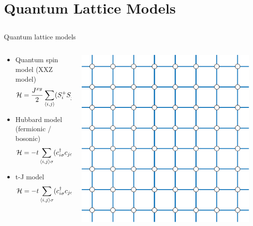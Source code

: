 \section{Quantum Lattice Models}
\subsection*{\redb\whiteb\greenb}

\begin{frame}[fragile]{Quantum lattice models}
  \begin{columns}[T]
    \begin{column}{.8\textwidth}
      \begin{itemize}
        \setlength{\itemsep}{-.5em}
      \item Quantum spin model (XXZ model)
        \begin{equation*} {\cal H} = \frac{J^{xy}}{2}
          \sum_{\langle i,j \rangle} (S^+_i S^-_j + S^-_i S^+_j) + J^z
          \sum_{\langle i,j \rangle} S^z_i S^z_j
        \end{equation*}
      \item Hubbard model (fermionic / bosonic)
        \begin{equation*} {\cal H} = -t \sum_{\langle i,j \rangle \sigma}
          (c^\dagger_{i\sigma} c_{j\sigma} + \mbox{h.c.}) + U \sum_{i}
          n_{i\uparrow} n_{i\downarrow}
        \end{equation*}
      \item t-J model\begin{equation*} {\cal H} = -t \sum_{\langle i,j \rangle \sigma}
        (c^\dagger_{i\sigma} c_{j\sigma} + \mbox{h.c.}) + J \sum_{i,j}
        ({\bf S}_i \cdot {\bf S}_j - n_{i} n_{j} / 4) \end{equation*}
      \end{itemize}
    \end{column}
    \begin{column}{.2\textwidth}
      \includegraphics[width=\textwidth]{square.pdf}

\end{column}
\end{columns}
\end{frame}
